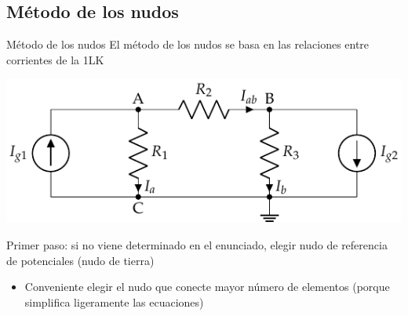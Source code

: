 \documentclass[aspectratio=169, xcolor={usenames,svgnames,dvipsnames}]{beamer}
\begin{document}



\subsection{Método de los nudos}

\begin{frame}{Método de los nudos}
    \vspace{2mm}
    El \alert{método de los nudos} se basa en las relaciones entre corrientes de la 1LK
    \begin{center}
    \includegraphics[width=.8\linewidth]{../figs/nudos.pdf}
    \end{center}

    \alert{Primer paso}: si no viene determinado en el enunciado, elegir \alert{nudo de referencia} de potenciales (nudo de tierra)

    \begin{itemize}
        \item {\normalsize Conveniente elegir el nudo que conecte mayor número de elementos (porque simplifica ligeramente las ecuaciones)} 
    \end{itemize}
\end{frame}

\end{document}
